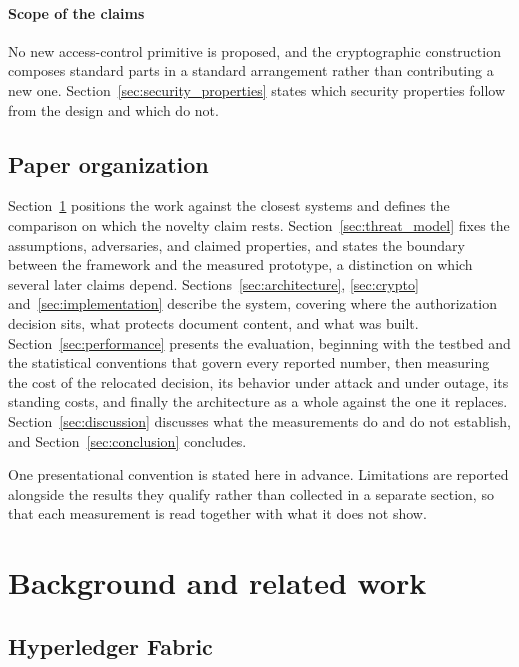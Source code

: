 \documentclass[preprint,12pt]{elsarticle}
\begin{document}
\paragraph{Scope of the claims}
No new access-control primitive is proposed, and the cryptographic construction
composes standard parts in a standard arrangement rather than contributing a new
one. Section~\ref{sec:security_properties} states which security properties
follow from the design and which do not.


\subsection{Paper organization}
\label{sec:organization}

Section~\ref{sec:related} positions the work against the closest systems and
defines the comparison on which the novelty claim rests.
Section~\ref{sec:threat_model} fixes the assumptions, adversaries, and claimed
properties, and states the boundary between the framework and the measured
prototype, a distinction on which several later claims depend.
Sections~\ref{sec:architecture}, \ref{sec:crypto}
and~\ref{sec:implementation} describe the system, covering where the
authorization decision sits, what protects document content, and what was
built. Section~\ref{sec:performance} presents the evaluation, beginning with
the testbed and the statistical conventions that govern every reported number,
then measuring the cost of the relocated decision, its behavior under attack
and under outage, its standing costs, and finally the architecture as a whole
against the one it replaces. Section~\ref{sec:discussion} discusses what the
measurements do and do not establish, and Section~\ref{sec:conclusion}
concludes.

One presentational convention is stated here in advance. Limitations are
reported alongside the results they qualify rather than collected in a separate
section, so that each measurement is read together with what it does not show.


\section{Background and related work}
\label{sec:related}

\subsection{Hyperledger Fabric}
\label{sec:fabric}
\end{document}
